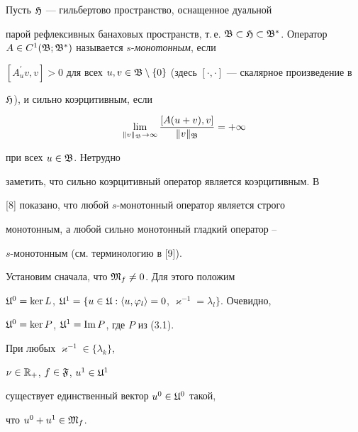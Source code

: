 Пусть ${\frak H}$ --- гильбертово пространство, оснащенное дуальной


парой рефлексивных банаховых пространств, т.\,е. ${\frak B} \subset


{\frak H} \subset {\frak B}^{*}$. Оператор $A \in C^1({\frak B};


{\frak B}^{*})$ называется $s$-{\it монотонным}, если


$[A^{\prime}_{u}v,v] > 0$ для всех $u, v \in {\frak B} \setminus


\{ 0 \}$ (здесь $[ \cdot, \cdot ]$ --- скалярное произведение в


${\frak H}$), и сильно коэрцитивным, если


$$


\lim\limits_{ \| v\|_{\frak B} \to \infty} \frac{[A(u +v), v]}{ \| v \|


_{\frak B}} = + \infty


$$


при всех $u \in  {\frak B}$. Нетрудно


заметить, что сильно коэрцитивный оператор является коэрцитивным. В


[8] показано, что любой $s$-монотонный оператор является строго


монотонным, а любой сильно монотонный гладкий оператор --


$s$-монотонным (см. терминологию в [9]).





Установим сначала, что ${\frak M}_f \ne 0$. Для этого положим


${\frak U}^0 = \ker L$, ${\frak U}^1 = \{ u \in {\frak U}: \langle


u, \varphi_l \rangle = 0$, $\varkappa^{-1} = \lambda _l \}$. Очевидно,


${\frak U}^0 = \ker P$, ${\frak U}^1 = \operatorname{Im} P$, где $P$ из (3.1).





\begin{lems}


При любых $\varkappa^{-1} \in \{ \lambda_k \}$,


$\nu \in {\Bbb R}_{+}$, $f \in {\frak F}$, $u^1 \in {\frak U}^1$ 


существует единственный вектор $u^0 \in {\frak U}^0$ такой,


что $u^0 + u^1 \in {\frak M}_f$.


\end{lems}





